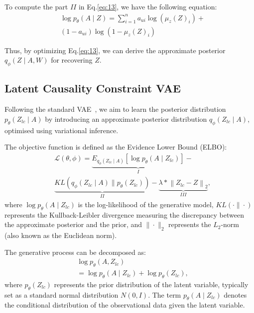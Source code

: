 \documentclass[sigconf]{acmart}
\begin{document}
To compute the part $II$ in Eq.\eqref{eq:13}, we have the following equation:
\begin{equation}
\begin{split}
&\log p_\theta\left({A} \mid {Z}\right)=\sum_{i=1}^n a_{u i} \log \left(\mu_z\left({Z}\right)_i\right)+  \\& \left(1-a_{u i}\right) \log \left(1-\mu_z\left({Z}\right)_i\right)
\end{split}
\end{equation}



Thus, by optimizing Eq.\eqref{eq:13}, we can derive the approximate posterior $q_\phi\left({Z} \mid {A}, {W}\right)$ for recovering ${Z}$.



\subsection{Latent Causality Constraint VAE}
Following the standard VAE~\cite{vae}, we aim to learn the posterior distribution \(p_\theta(Z_{lc} \mid A)\) by introducing an approximate posterior distribution \(q_\phi(Z_{lc} \mid A)\), optimised using variational inference.


The objective function is defined as the Evidence Lower Bound (ELBO):
\begin{equation}
\begin{aligned}
\label{eq:vae1}
&\mathcal{L}(\theta, \phi) = \underbrace{{E}_{q_\phi(Z_{lc} \mid A)} \left[ \log p_\theta(A \mid Z_{lc}) \right]}_{I} - \\
& \underbrace{{KL}\left(q_\phi(Z_{lc} \mid A) \parallel p_\theta(Z_{lc})\right)}_{II} 
-\underbrace{\lambda*\left\|Z_{lc}-Z\right\|_2}_{III},
\end{aligned}
\end{equation}
where \(\log p_\theta(A \mid Z_{lc})\) is the log-likelihood of the generative model, \({KL}(\cdot\|\cdot)\) represents the Kullback-Leibler divergence measuring the discrepancy between the approximate posterior and the prior, and \(\| \cdot \|_2\) represents the $L_2$-norm (also known as the Euclidean norm).


The generative process can be decomposed as:
\begin{equation}
\begin{aligned}
&\log p_\theta(A, Z_{lc}) \\
&= \log p_\theta(A \mid Z_{lc}) + \log p_\theta(Z_{lc}),
\end{aligned}
\end{equation}
where \(p_\theta(Z_{lc})\) represents the prior distribution of the latent variable, typically set as a standard normal distribution \({N}(0, I)\). The term \(p_\theta(A \mid Z_{lc})\) denotes the conditional distribution of the observational data given the latent variable.
\end{document}
